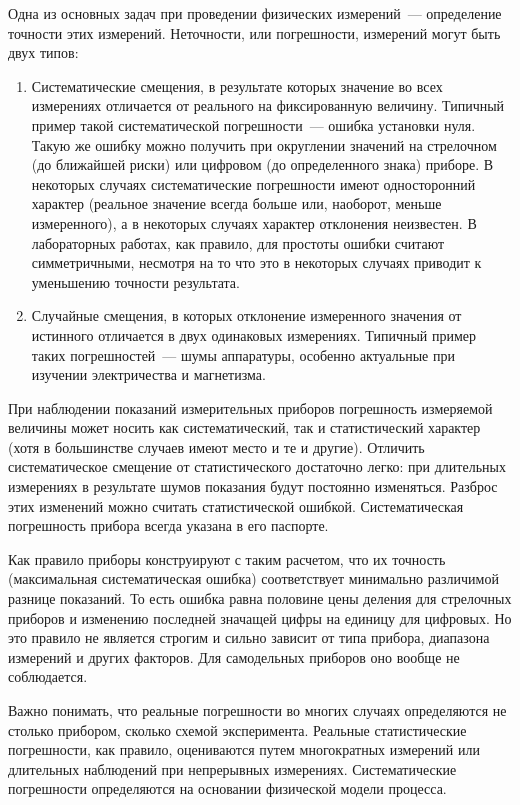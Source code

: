 
Одна из основных задач при проведении физических измерений~--- определение
точности этих измерений. Неточности, или погрешности, измерений могут быть двух
типов:

\begin{enumerate}
	\item Систематические смещения, в результате которых значение во всех
измерениях отличается от реального на фиксированную величину. Типичный пример
такой систематической погрешности~--- ошибка установки нуля. Такую же ошибку
можно получить при округлении значений на стрелочном (до ближайшей риски) или
цифровом (до определенного знака) приборе. В некоторых случаях систематические
погрешности имеют односторонний характер (реальное значение всегда больше или,
наоборот, меньше измеренного), а в некоторых случаях характер отклонения
неизвестен. В лабораторных работах, как правило, для простоты ошибки считают
симметричными, несмотря на то что это в некоторых случаях приводит к уменьшению
точности результата.

	\item Случайные смещения, в которых отклонение измеренного значения от
истинного отличается в двух одинаковых измерениях. Типичный пример таких
погрешностей~--- шумы аппаратуры, особенно актуальные при изучении электричества
и магнетизма.
\end{enumerate}

При наблюдении показаний измерительных приборов погрешность измеряемой величины
может носить как систематический, так и статистический характер (хотя в
большинстве случаев имеют место и те и другие). Отличить систематическое
смещение от статистического достаточно легко: при длительных измерениях в
результате шумов показания будут постоянно изменяться. Разброс этих изменений
можно считать статистической ошибкой. Систематическая погрешность прибора всегда
указана в его паспорте.

Как правило приборы конструируют с таким расчетом, что их точность (максимальная
систематическая ошибка) соответствует минимально различимой разнице показаний.
То есть ошибка равна половине цены деления для стрелочных приборов и изменению
последней значащей цифры на единицу для цифровых. Но это правило не является
строгим и сильно зависит от типа прибора, диапазона измерений и других факторов.
Для самодельных приборов оно вообще не соблюдается.

Важно понимать, что реальные погрешности во многих случаях определяются не
столько прибором, сколько схемой эксперимента. Реальные статистические
погрешности, как правило, оцениваются путем многократных измерений или
длительных наблюдений при непрерывных измерениях. Систематические погрешности
определяются на основании физической модели процесса.
